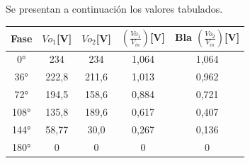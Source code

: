 Se presentan a continuación los valores tabulados.

\begin{table}[H]
\centering
  \begin{tabular}{|c|c|c|c|c|}
    \hline
      Fase & $Vo_1$[V] & $Vo_2$[V] & $(\frac{Vo_1}{V_{in}})$[V] & Bla $(\frac{Vo_2}{V_{in}})$[V] \\
    \hline
      0°    & 234     & 234     & 1,064   & 1,064\\
      36°   & 222,8   & 211,6   & 1,013   & 0,962\\
      72°   & 194,5   & 158,6   & 0,884   & 0,721\\
      108°  & 135,8   & 189,6   & 0,617   & 0,407\\
      144°  & 58,77   & 30,0    & 0,267   & 0,136\\
      180°  & 0       & 0       & 0       & 0\\
    \hline
  \end{tabular}
\end{table}



